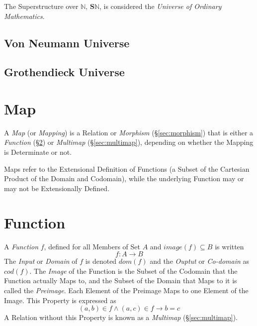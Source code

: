 \documentclass{article}
\begin{document}
The Superstructure over $\mathbb{N}$, $\mathbf{S}\mathbb{N}$, is
considered the \emph{Universe of Ordinary Mathematics}.



\subsection{Von Neumann Universe}\label{subsec:vonneumann_universe}

\subsection{Grothendieck Universe}\label{subsec:grothendieck_universe}




\section{Map}\label{sec:set_map}

A \emph{Map} (or \emph{Mapping}) is a Relation or \emph{Morphism}
(\S\ref{sec:morphism}) that is either a \emph{Function}
(\S\ref{sec:set_function}) or \emph{Multimap} (\S\ref{sec:multimap}),
depending on whether the Mapping is Determinate or not.

Maps refer to the Extensional Definition of Functions (a Subset of the
Cartesian Product of the Domain and Codomain), while the underlying
Function may or may not be Extensionally Defined.



\section{Function}\label{sec:set_function}

A \emph{Function} $f$, defined for all Members of Set $A$ and $image(f)
\subseteq B$ is written
\[
    f : A \rightarrow B
\]
The \emph{Input} or \emph{Domain} of $f$ is denoted $dom(f)$ and the
\emph{Ouptut} or \emph{Co-domain} as $cod(f)$. The \emph{Image} of the
Function is the Subset of the Codomain that the Function actually Maps
to, and the Subset of the Domain that Maps to it is called the
\emph{Preimage}. Each Element of the Preimage Maps to one Element of
the Image. This Property is expressed as
\[
    (a,b) \in f \wedge (a,c) \in f \rightarrow b = c
\]
A Relation without this Property is known as a \emph{Multimap}
(\S\ref{sec:multimap}).
\end{document}
